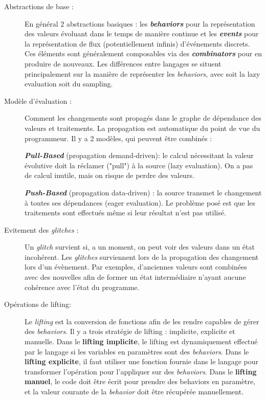 \documentclass[10pt,final]{IEEEtran}
\begin{document}
\begin{description}
    \item[Abstractions de base :]
    En général 2 abstractions basiques : les \textbf{\textit{behaviors}} pour la représentation des valeurs évoluant dans le temps de manière continue et les \textbf{\textit{events}} pour la représentation de flux (potentiellement infinis) d'événements discrets. Ces éléments sont généralement composables via des \textbf{\textit{combinators}} pour en produire de nouveaux. Les différences entre langages se situent principalement sur la manière de représenter les \textit{behaviors}, avec soit la lazy evaluation soit du sampling.
    
    \item[Modèle d'évaluation :]
    Comment les changements sont propagés dans le graphe de dépendance des valeurs et traitements. La propagation est automatique du point de vue du programmeur. Il y a 2 modèles, qui peuvent être combinés :
    
    \textbf{\textit{Pull-Based}} (propagation demand-driven):  le calcul nécessitant la valeur évolutive doit la réclamer ("pull") à la source (lazy evaluation). On a pas de calcul inutile, mais on risque de perdre des valeurs.
    
    \textbf{\textit{Push-Based}} (propagation data-driven) : la source transmet le changement à toutes ses dépendances (eager evaluation). Le problème posé est que les traitements sont effectués même si leur résultat n'est pas utilisé.
    
    \item[Evitement des \textit{glitches} :]
    Un \textit{glitch} survient si, a un moment, on peut voir des valeurs dans un état incohérent. Les \textit{glitches} surviennent lors de la propagation des changement lors d'un évènement. Par exemples, d'anciennes valeurs sont combinées avec des nouvelles afin de former un état intermédiaire n'ayant aucune cohérence avec l'état du programme.
    
    \item[Opérations de lifting:]
    Le \textit{lifting} est la conversion de fonctions afin de les rendre capables de gérer des \textit{behaviors}. Il y a trois stratégie de lifting : implicite, explicite et manuelle. Dans le \textbf{lifting implicite}, le lifting est dynamiquement effectué par le langage si les variables en paramètres sont des \textit{behaviors}. Dans le \textbf{lifting explicite}, il faut utiliser une fonction fournie dans le langage pour transformer l'opération pour l'appliquer sur des \textit{behaviors}. Dans le \textbf{lifting manuel}, le code doit être écrit pour prendre des behaviors en paramètre, et la valeur courante de la \textit{behavior} doit être récupérée manuellement.
    

\end{description}
\end{document}
